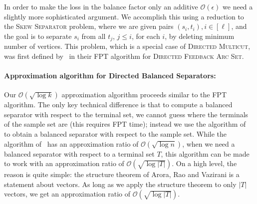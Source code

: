 \documentclass[11pt]{article}
\newcommand{\OO}{\mathcal{O}}
\newcommand{\SMC}{{\textsc{Skew Separator}}}
\newcommand{\DFAS}{{\textsc{Directed Feedback Arc Set}}}
\begin{document}
 In order to make the loss in the balance factor only an additive $\OO(\epsilon)$ we need a slightly more sophisticated argument. We accomplish this using a reduction to the \SMC{} problem, where we are given pairs $(s_i, t_i), i \in [\ell]$, and the goal is to separate $s_i$ from all $t_j$, $j \leq i$, for each $i$, by deleting minimum number of vertices. This problem, which is a special case of {\textsc{Directed Multicut}}{}, was first defined by~\cite{chen2008fixed} in their FPT algorithm for \DFAS.


\paragraph{Approximation algorithm for Directed Balanced Separators:} Our $\OO(\sqrt{\log k})$ approximation algorithm proceeds similar to the FPT algorithm. The only key technical difference is that to compute a balanced separator with respect to the terminal set, we cannot guess where the terminals of the sample set are (this requires FPT time); instead we use the algorithm of~\cite{agarwal2005log} to obtain a balanced separator with respect to the sample set. While the algorithm of~\cite{agarwal2005log} has an approximation ratio of $\OO(\sqrt{\log n})$, when we need a balanced separator with respect to a terminal set $T$, this algorithm can be made to work with an approximation ratio of $\OO(\sqrt{\log |T|})$. On a high level, the reason is quite simple: the structure theorem of Arora, Rao and Vazirani \cite{arora2009expander} is a statement about vectors. As long as we apply the structure theorem to only $|T|$ vectors, we get an approximation ratio of $\OO(\sqrt{\log |T|})$. 
\end{document}
